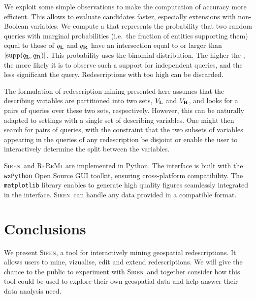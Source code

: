\documentclass{sig-alternate}
\newcommand{\Siren}{\textsc{Siren}}
\newcommand{\ReReMi}{\textsc{ReReMi}}
\begin{document}
We exploit some
simple observations to make the computation of accuracy more
efficient. This allows to evaluate candidates faster, especially
extensions with non-Boolean variables.
We compute a \pValue{} that represents the probability that two random
queries with marginal probabilities (i.e.\ the fraction of entities
supporting them) equal to those of $q_{\mathbf{L}}$ and $q_{\mathbf{R}}$ have an
intersection equal to or larger than $\abs{\supp(q_\iLHS,
  q_\iRHS)}$. This probability uses the binomial distribution. The higher the
\pValue, the more likely it is to observe such a support for
independent queries, and the less significant the query. Redescriptions with too high \pValue{} can be discarded.

The formulation of redescription mining presented here assumes that the
describing variables are partitioned into two sets, $V_{\mathbf{L}}$ and
$V_{\mathbf{R}}$, and looks for a pairs of queries over these two sets,
respectively.  However, this can be naturally adapted to settings with
a single set of describing variables.  One might then search for pairs
of queries, with the constraint that the two subsets of variables
appearing in the queries of any redescription be disjoint or enable
the user to interactively determine the split between the variables.

\Siren\ and \ReReMi\ are implemented in Python.  The interface is built
with the \texttt{wxPython} Open Source GUI toolkit, ensuring
cross-platform compatibility.  The \texttt{matplotlib} library enables
to generate high quality figures seamlessly integrated in the
interface.  \Siren\ can handle any data provided in a compatible
format.

\section{Conclusions}
We present \Siren, a tool for interactively mining geospatial
redescriptions. It allows users to mine, vizualise, edit and extend
redescriptions.
We will give the chance to the public to experiment with \Siren\ and
together consider how this tool could be used to explore their own geospatial
data and help answer their data analysis need.


  
\balancecolumns

\end{document}

